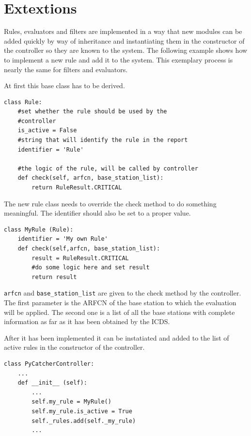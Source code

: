 \section{Extextions}
\label{sec:extensions}
Rules, evaluators and filters are implemented in a way that new modules can be added quickly by way of inheritance and instantiating them in the constructor of the controller so they are known to the system.
The following example shows how to implement a new rule and add it to the system.
This exemplary process is nearly the same for filters and evaluators.

At first this base class has to be derived.
\begin{lstlisting}
class Rule:
    #set whether the rule should be used by the 
    #controller
    is_active = False
    #string that will identify the rule in the report
    identifier = 'Rule'

    #the logic of the rule, will be called by controller
    def check(self, arfcn, base_station_list):
        return RuleResult.CRITICAL
\end{lstlisting}

The new rule class needs to override the check method to do something meaningful.
The identifier should also be set to a proper value.
\begin{lstlisting}
class MyRule (Rule):
    identifier = 'My own Rule'
    def check(self,arfcn, base_station_list):
        result = RuleResult.CRITICAL
        #do some logic here and set result 
        return result
\end{lstlisting}
\texttt{arfcn} and \texttt{base\_station\_list} are given to the check method by the controller.
The first parameter is the ARFCN of the base station to which the evaluation will be applied.
The second one is a list of all the base stations with complete information as far as it has been
obtained by the ICDS.

After it has been implemented it can be instatiated and added to the list of active rules in the 
constructor of the controller.
\begin{lstlisting}
class PyCatcherController:
    ...
    def __init__ (self):
        ...
        self.my_rule = MyRule()
        self.my_rule.is_active = True
        self._rules.add(self._my_rule)
        ...
\end{lstlisting}
